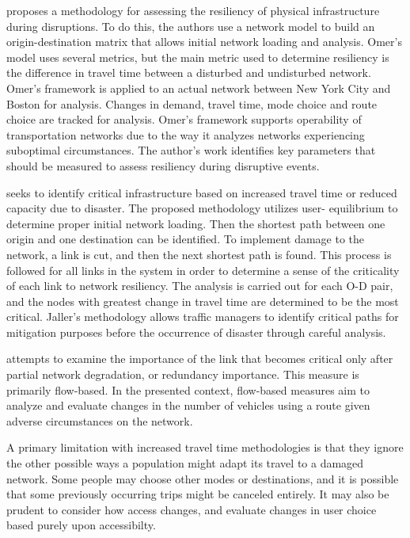 \citet{omer2013} proposes a methodology for assessing the resiliency of
physical infrastructure
during disruptions. To do this, the authors use a network model to build
an origin-destination
matrix that allows initial network loading and analysis. Omer’s model uses
several metrics, but
the main metric used to determine resiliency is the difference in travel
time between a disturbed
and undisturbed network. Omer’s framework is applied to an actual network
between New York City
and Boston for analysis. Changes in demand, travel time, mode choice and
route choice are tracked
for analysis. Omer’s framework supports operability of transportation
networks due to the way it
analyzes networks experiencing suboptimal circumstances. The author's work
identifies key
parameters that should be measured to assess resiliency during disruptive
events.

\citet{jaller2015} seeks to identify critical infrastructure based on
increased travel time or
reduced capacity due to disaster. The proposed methodology utilizes user-
equilibrium to determine
proper initial network loading. Then the shortest path between one origin
and one destination
can be identified. To implement damage to the network, a link is cut, and
then the next shortest
path is found. This process is followed for all links in the system in
order to determine a sense
of the criticality of each link to network resiliency. The analysis is
carried out for each O-D
pair, and the nodes with greatest change in travel time are determined to
be the most critical.
Jaller’s methodology allows traffic managers to identify critical paths
for mitigation purposes
before the occurrence of disaster through careful analysis.

\citet{Jenelius2010} attempts to examine the importance of the link that
becomes critical only after partial network degradation, or redundancy
importance. This measure is primarily flow-based. In the presented context, flow-based measures aim to analyze and evaluate changes in the number of vehicles using a route given adverse circumstances on the network.

A primary limitation with increased travel time methodologies is that they
ignore the other possible ways a population might adapt its travel to a
damaged
network. Some people may choose other modes or destinations, and it is
possible
that some previously occurring trips might be canceled entirely. It may also be prudent to consider how access changes, and evaluate changes in user choice based purely upon accessibilty.

